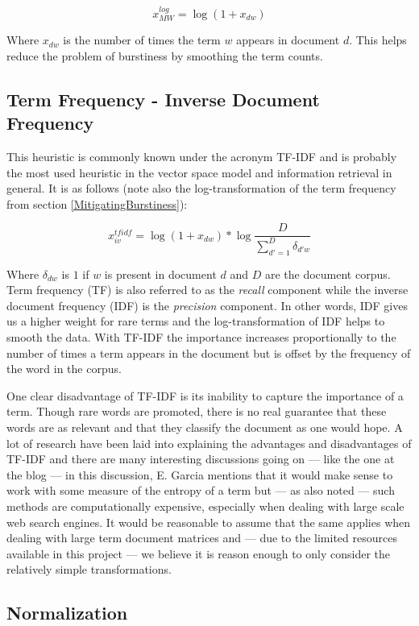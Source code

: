 \[
x_{MW}^{log} = \log{(1 + x_{dw})}
\]

Where $x_{dw}$ is the number of times the term $w$ appears in document
$d$. This helps reduce the problem of burstiness by smoothing the term
counts.

\subsection{Term Frequency - Inverse Document Frequency\label{TFIDF}}

This heuristic is commonly known under the acronym TF-IDF and is
probably the most used heuristic in the vector space model and
information retrieval in general. It is as follows (note also the
log-transformation of the term frequency from
section \ref{MitigatingBurstiness}):

\[
x_{iv}^{tfidf} = \log{(1 + x_{dw})} * \log{\frac{D}{\sum_{d\prime = 1}^{D}\delta_{d\prime w}} }
\]

Where $\delta_{dw}$ is $1$ if $w$ is present in document $d$ and $D$
are the document corpus. Term frequency (TF) is also referred to as the
\textit{recall} component while the inverse document frequency (IDF)
is the \textit{precision} component. In other words, IDF gives us a
higher weight for rare terms and the log-transformation of IDF helps
to smooth the data. With TF-IDF the importance increases
proportionally to the number of times a term appears in the document
but is offset by the frequency of the word in the corpus.

One clear disadvantage of TF-IDF is its inability to capture the
importance of a term. Though rare words are promoted, there is no real
guarantee that these words are as relevant and that they classify the
document as one would hope. A lot of research have been laid into
explaining the advantages and disadvantages of TF-IDF and there are
many interesting discussions going on --- like the one at the blog
\cite{UnderstandingTFIDF} --- in this discussion, E. Garcia mentions
that it would make sense to work with some measure of the entropy of a
term but --- as also noted --- such methods are computationally
expensive, especially when dealing with large scale web search
engines. It would be reasonable to assume that the same applies when
dealing with large term document matrices and --- due to the limited
resources available in this project --- we believe it is reason enough
to only consider the relatively simple transformations.

\subsection{Normalization} 

